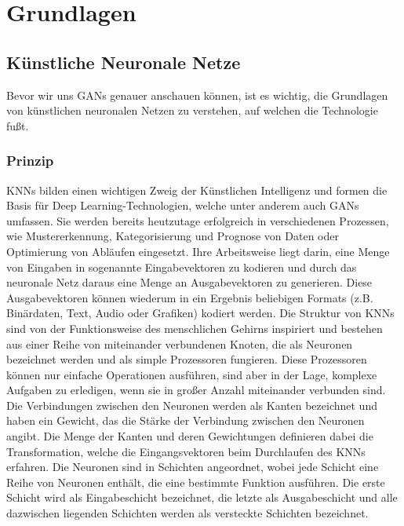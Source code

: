 \chapter{Grundlagen}

\section{Künstliche Neuronale Netze}

\noindent Bevor wir uns \acp{GAN} genauer anschauen können, ist es wichtig, die Grundlagen von künstlichen neuronalen Netzen zu verstehen, auf welchen die Technologie fußt.

\subsection{Prinzip}

\noindent \acp{KNN} bilden einen wichtigen Zweig der Künstlichen Intelligenz und formen die Basis für Deep Learning-Technologien, welche unter anderem auch GANs umfassen. Sie werden bereits heutzutage erfolgreich in verschiedenen Prozessen, wie Mustererkennung, Kategorisierung und Prognose von Daten oder Optimierung von Abläufen eingesetzt. Ihre Arbeitsweise liegt darin, eine Menge von Eingaben in sogenannte Eingabevektoren zu kodieren und durch das neuronale Netz daraus eine Menge an Ausgabevektoren zu generieren. Diese Ausgabevektoren können wiederum in ein Ergebnis beliebigen Formats (z.B. Binärdaten, Text, Audio oder Grafiken) kodiert werden. Die Struktur von \acp{KNN} sind von der Funktionsweise des menschlichen Gehirns inspiriert und bestehen aus einer Reihe von miteinander verbundenen Knoten, die als Neuronen bezeichnet werden und als simple Prozessoren fungieren. Diese Prozessoren können nur einfache Operationen ausführen, sind aber in der Lage, komplexe Aufgaben zu erledigen, wenn sie in großer Anzahl miteinander verbunden sind. Die Verbindungen zwischen den Neuronen werden als Kanten bezeichnet und haben ein Gewicht, das die Stärke der Verbindung zwischen den Neuronen angibt. Die Menge der Kanten und deren Gewichtungen definieren dabei die Transformation, welche die Eingangsvektoren beim Durchlaufen des \ac{KNN}s erfahren. Die Neuronen sind in Schichten angeordnet, wobei jede Schicht eine Reihe von Neuronen enthält, die eine bestimmte Funktion ausführen. Die erste Schicht wird als Eingabeschicht bezeichnet, die letzte als Ausgabeschicht und alle dazwischen liegenden Schichten werden als versteckte Schichten bezeichnet.\cite{knnbook}\\

